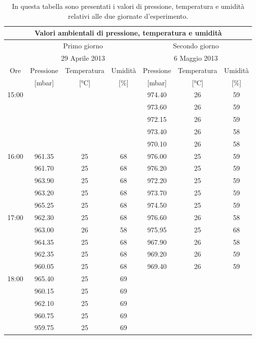 \begin{table}
    \begin{tabular}{c | c c c | c c c}
	    \multicolumn{7}{c}{\textbf{Valori ambientali di pressione, temperatura e umidità}} \\
        \toprule
        \multirow{2}{*}{$\,$} & \multicolumn{3}{c|}{Primo giorno} & \multicolumn{3}{c}{Secondo giorno} \\
         & \multicolumn{3}{c|}{29 Aprile 2013} & \multicolumn{3}{c}{6 Maggio 2013} \\
        \midrule
        Ore & Pressione & Temperatura & Umidità & Pressione & Temperatura & Umidità \\
         & [\si{\milli\bar}] & [\si{\celsius}] & [\%] & [\si{\milli\bar}] & [\si{\celsius}] & [\%] \\
        \midrule
        \multirow{5}{*}{15:00} & $\,$ & $\,$ & $\,$ & 974.40 & 26 & 59 \\
         & $\,$ & $\,$ & $\,$ & 973.60 & 26 & 59 \\
         & $\,$ & $\,$ & $\,$ & 972.15 & 26 & 59 \\
         & $\,$ & $\,$ & $\,$ & 973.40 & 26 & 58 \\
         & $\,$ & $\,$ & $\,$ & 970.10 & 26 & 58 \\
        \midrule
        \multirow{5}{*}{16:00} & 961.35 & 25 & 68 & 976.00 & 25 & 59 \\
         & 961.70 & 25 & 68 & 976.20 & 25 & 59 \\
         & 963.90 & 25 & 68 & 972.20 & 25 & 59 \\
         & 963.20 & 25 & 68 & 973.70 & 25 & 59 \\
         & 965.25 & 25 & 68 & 974.50 & 25 & 59 \\
        \midrule
        \multirow{5}{*}{17:00} & 962.30 & 25 & 68 & 976.60 & 26 & 58 \\
         & 963.00 & 26 & 58 & 975.95 & 25 & 68 \\
         & 964.35 & 25 & 68 & 967.90 & 26 & 58\\
         & 962.35 & 25 & 68 & 969.20 & 26 & 59\\
         & 960.05 & 25 & 68 & 969.40 & 26 & 59 \\
        \midrule
        \multirow{5}{*}{18:00} & 965.40 & 25 & 69 & $\,$ & $\,$ & $\,$ \\
         & 960.15 & 25 & 69 & $\,$ & $\,$ & $\,$ \\
         & 962.10 & 25 & 69 & $\,$ & $\,$ & $\,$ \\
         & 960.75 & 25 & 69 & $\,$ & $\,$ & $\,$ \\
         & 959.75 & 25 & 69 & $\,$ & $\,$ & $\,$ \\
        \bottomrule
    \end{tabular}


    \caption{In questa tabella sono presentati i valori di pressione, temperatura e umidità relativi alle due giornate d'esperimento.}
    \label{tab:ptu}
\end{table}
